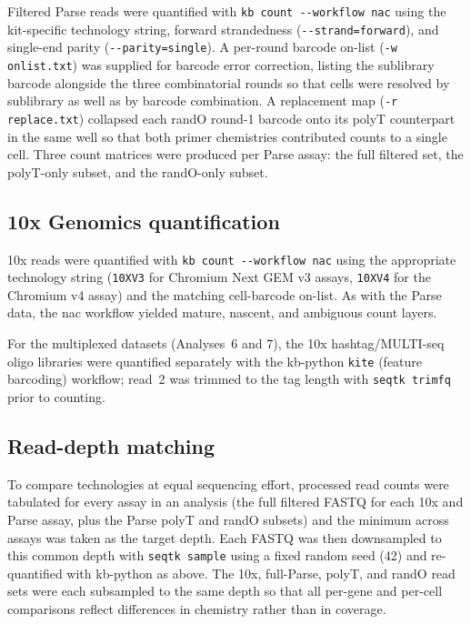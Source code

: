 Filtered Parse reads were quantified with \texttt{kb count -{}-workflow nac} using
the kit-specific technology string, forward strandedness
(\texttt{-{}-strand=forward}), and single-end parity
(\texttt{-{}-parity=single}). A per-round barcode on-list (\texttt{-w onlist.txt})
was supplied for barcode error correction, listing the sublibrary barcode alongside
the three combinatorial rounds so that cells were resolved by sublibrary as well as
by barcode combination. A replacement map
(\texttt{-r replace.txt}) collapsed each randO round-1 barcode onto its polyT
counterpart in the same well so that both primer chemistries contributed counts to a
single cell. Three count matrices were produced per Parse assay: the full filtered
set, the polyT-only subset, and the randO-only subset.

\subsection{10x Genomics quantification}

10x reads were quantified with \texttt{kb count -{}-workflow nac} using the
appropriate technology string (\texttt{10XV3} for Chromium Next GEM v3 assays,
\texttt{10XV4} for the Chromium v4 assay) and the matching cell-barcode on-list. As
with the Parse data, the nac workflow yielded mature, nascent, and ambiguous count
layers.

For the multiplexed datasets (Analyses~6 and 7), the 10x hashtag/MULTI-seq oligo
libraries were quantified separately with the kb-python \texttt{kite} (feature
barcoding) workflow; read~2 was trimmed to the tag length with \texttt{seqtk
trimfq}~\cite{seqtk} prior to counting.

\subsection{Read-depth matching}

To compare technologies at equal sequencing effort, processed read counts were
tabulated for every assay in an analysis (the full filtered FASTQ for each 10x and
Parse assay, plus the Parse polyT and randO subsets) and the minimum across assays
was taken as the target depth. Each FASTQ was then downsampled to this common depth
with \texttt{seqtk sample} using a fixed random seed (42) and re-quantified with
kb-python as above. The 10x, full-Parse, polyT, and randO read sets were each
subsampled to the same depth so that all per-gene and per-cell comparisons reflect
differences in chemistry rather than in coverage.


